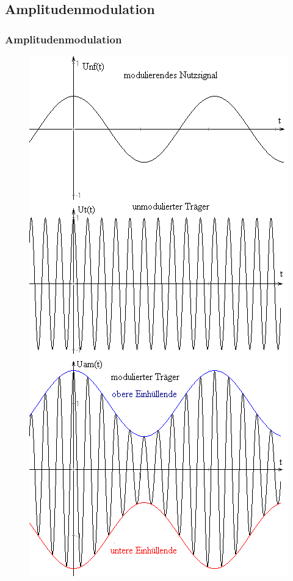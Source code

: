 \subsection[AM]{Amplitudenmodulation}
\begin{frame}
  \frametitle{Amplitudenmodulation}
  \begin{minipage}{0.3\textwidth}
    \begin{figure}
      \includegraphics[width=1\textwidth,height=.75\textheight,keepaspectratio]{e14/AM1.png}

\end{figure}
\end{minipage}
\end{frame}
